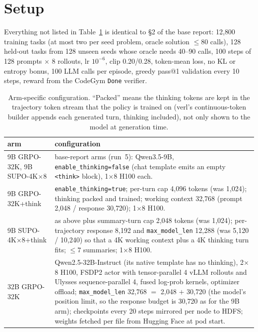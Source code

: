 \documentclass[11pt]{article}
\newcommand{\p}[1]{\texttt{#1}}
\begin{document}
\section{Setup}
Everything not listed in Table~\ref{tab:config} is identical to \S2 of the base report: 12{,}800 training tasks (at most two per seed problem, oracle solution $\le 80$ calls), 128 held-out tasks from 128 unseen seeds whose oracle needs 40--90 calls, 100 steps of 128 prompts $\times$ 8 rollouts, lr $10^{-6}$, clip 0.20/0.28, token-mean loss, no KL or entropy bonus, 100 LLM calls per episode, greedy pass@1 validation every 10 steps, reward from the CodeGym \p{Done} verifier.

\begin{table}[h]\centering\small
\caption{Arm-specific configuration. ``Packed'' means the thinking tokens are kept in the trajectory token stream that the policy is trained on (verl's continuous-token builder appends each generated turn, thinking included), not only shown to the model at generation time.}
\label{tab:config}
\begin{tabular}{@{}p{3.1cm}p{12.6cm}@{}}\toprule
arm & configuration \\ \midrule
9B GRPO-32K, 9B SUPO-4K$\times$8 & base-report arms (run~5): Qwen3.5-9B, \p{enable\_thinking=false} (chat template emits an empty \p{<think>} block), 1$\times$8 H100 each.\\
9B GRPO-32K+think & \p{enable\_thinking=true}; per-turn cap 4{,}096 tokens (was 1{,}024); thinking packed and trained; working context 32{,}768 (prompt 2{,}048 / response 30{,}720); 1$\times$8 H100.\\
9B SUPO-4K$\times$8+think & as above plus summary-turn cap 2{,}048 tokens (was 1{,}024); per-trajectory response 8{,}192 and \p{max\_model\_len} 12{,}288 (was 5{,}120 / 10{,}240) so that a 4K working context plus a 4K thinking turn fits; $\le 7$ summaries; 1$\times$8 H100.\\
32B GRPO-32K & Qwen2.5-32B-Instruct (its native template has no thinking), 2$\times$8 H100, FSDP2 actor with tensor-parallel 4 vLLM rollouts and Ulysses sequence-parallel 4, fused log-prob kernels, optimizer offload; \p{max\_model\_len} 32{,}768 $=$ 2{,}048 $+$ 30{,}720 (the model's position limit, so the response budget is 30{,}720 as for the 9B arm); checkpoints every 20 steps mirrored per node to HDFS; weights fetched per file from Hugging Face at pod start.\\
\bottomrule\end{tabular}
\end{table}
\end{document}
